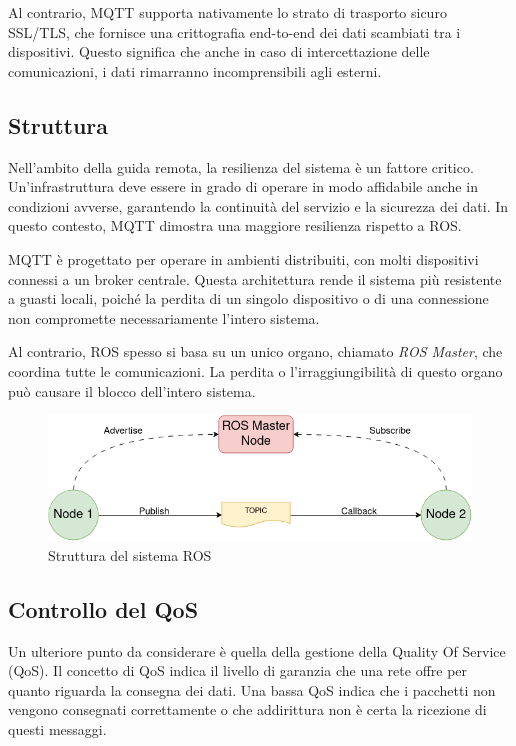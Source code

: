 \noindent Al contrario, MQTT supporta nativamente lo strato di trasporto sicuro SSL/TLS, che fornisce una crittografia end-to-end dei dati scambiati tra i dispositivi. Questo significa che anche in caso di intercettazione delle comunicazioni, i dati rimarranno incomprensibili agli esterni.

\subsection{Struttura}
Nell'ambito della guida remota, la resilienza del sistema è un fattore critico. Un'infrastruttura deve essere in grado di operare in modo affidabile anche in condizioni avverse, garantendo la continuità del servizio e la sicurezza dei dati. In questo contesto, MQTT dimostra una maggiore resilienza rispetto a ROS. 

\noindent MQTT è progettato per operare in ambienti distribuiti, con molti dispositivi connessi a un broker centrale. Questa architettura rende il sistema più resistente a guasti locali, poiché la perdita di un singolo dispositivo o di una connessione non compromette necessariamente l'intero sistema.

\noindent Al contrario, ROS spesso si basa su un unico organo, chiamato \textit{ROS Master}, che coordina tutte le comunicazioni. La perdita o l'irraggiungibilità di questo organo può causare il blocco dell'intero sistema.

\begin{figure}[H]
  \centering
  \includegraphics[width=1\textwidth]{figures/ros_master.png}
  \caption{Struttura del sistema ROS}
  \label{struttura_ros}
\end{figure}

\subsection{Controllo del QoS}
Un ulteriore punto da considerare è quella della gestione della Quality Of Service  (QoS). Il concetto di QoS indica il livello di garanzia che una rete offre per quanto riguarda la consegna dei dati. Una bassa QoS indica che i pacchetti non vengono consegnati correttamente o che addirittura non è certa la ricezione di questi messaggi.  

